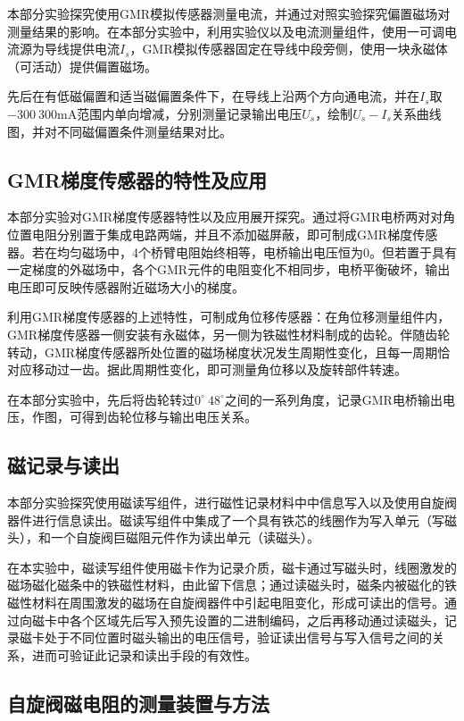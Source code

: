 \documentclass{thuemp}
\begin{document}
本部分实验探究使用GMR模拟传感器测量电流，并通过对照实验探究偏置磁场对测量结果的影响。在本部分实验中，利用实验仪以及电流测量组件，使用一可调电流源为导线提供电流$I_s$，GMR模拟传感器固定在导线中段旁侧，使用一块永磁体（可活动）提供偏置磁场。

先后在有低磁偏置和适当磁偏置条件下，在导线上沿两个方向通电流，并在$I_s$取$-300~300\mathrm{mA}$范围内单向增减，分别测量记录输出电压$U_s$，绘制$U_s - I_s$关系曲线图，并对不同磁偏置条件测量结果对比。

\subsection{GMR梯度传感器的特性及应用}

本部分实验对GMR梯度传感器特性以及应用展开探究。通过将GMR电桥两对对角位置电阻分别置于集成电路两端，并且不添加磁屏蔽，即可制成GMR梯度传感器。若在均匀磁场中，4个桥臂电阻始终相等，电桥输出电压恒为0。但若置于具有一定梯度的外磁场中，各个GMR元件的电阻变化不相同步，电桥平衡破坏，输出电压即可反映传感器附近磁场大小的梯度。

利用GMR梯度传感器的上述特性，可制成角位移传感器：在角位移测量组件内，GMR梯度传感器一侧安装有永磁体，另一侧为铁磁性材料制成的齿轮。伴随齿轮转动，GMR梯度传感器所处位置的磁场梯度状况发生周期性变化，且每一周期恰对应移动过一齿。据此周期性变化，即可测量角位移以及旋转部件转速。

在本部分实验中，先后将齿轮转过$0^\circ~48^\circ$之间的一系列角度，记录GMR电桥输出电压，作图，可得到齿轮位移与输出电压关系。

\subsection{磁记录与读出}

本部分实验探究使用磁读写组件，进行磁性记录材料中中信息写入以及使用自旋阀器件进行信息读出。磁读写组件中集成了一个具有铁芯的线圈作为写入单元（写磁头），和一个自旋阀巨磁阻元件作为读出单元（读磁头）。

在本实验中，磁读写组件使用磁卡作为记录介质，磁卡通过写磁头时，线圈激发的磁场磁化磁条中的铁磁性材料，由此留下信息；通过读磁头时，磁条内被磁化的铁磁性材料在周围激发的磁场在自旋阀器件中引起电阻变化，形成可读出的信号。通过向磁卡中各个区域先后写入预先设置的二进制编码，之后再移动通过读磁头，记录磁卡处于不同位置时磁头输出的电压信号，验证读出信号与写入信号之间的关系，进而可验证此记录和读出手段的有效性。

\subsection{自旋阀磁电阻的测量装置与方法}
\end{document}
